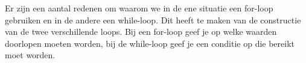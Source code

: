Er zijn een aantal redenen om waarom we in de ene situatie een for-loop gebruiken en in de andere een while-loop. Dit heeft te maken van de constructie van de twee verschillende loops. Bij een for-loop geef je op welke waarden doorlopen moeten worden, bij de while-loop geef je een conditie op die bereikt moet worden.
